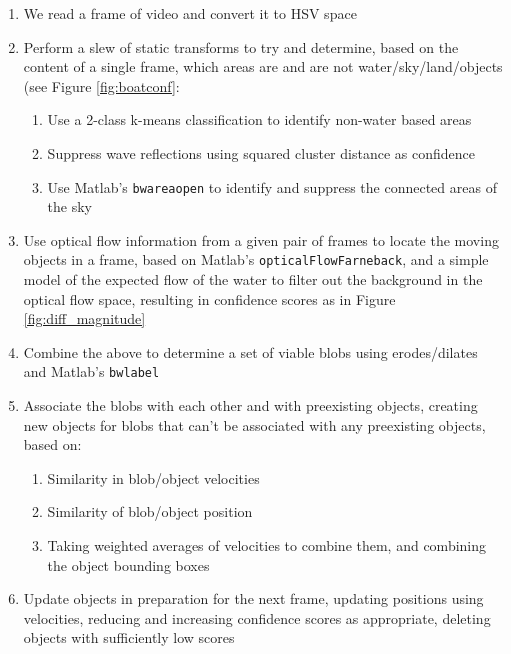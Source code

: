 \documentclass[conference]{IEEEtran}
\begin{document}
\begin{enumerate}
\item We read a frame of video and convert it to HSV space
\item Perform a slew of static transforms to try and determine,
      based on the content of a single frame, which areas are and
      are not water/sky/land/objects (see Figure \ref{fig:boatconf}:
  \begin{enumerate}
    \item Use a 2-class k-means classification to
          identify non-water based areas
    \item Suppress wave reflections using squared cluster distance as confidence
    \item Use Matlab's \texttt{bwareaopen} to
          identify and suppress the connected areas of the sky
  \end{enumerate}
\item Use optical flow information from a given pair of frames to
      locate the moving objects in a frame, based on Matlab's
      \texttt{opticalFlowFarneback}, and a simple model of the
      expected flow of the water to filter out the background in
      the optical flow space, resulting in confidence scores
      as in Figure \ref{fig:diff_magnitude}
\item Combine the above to determine a set of viable blobs using erodes/dilates
      and Matlab's \texttt{bwlabel}
\item Associate the blobs with each other and with preexisting objects,
      creating new objects for blobs that can't be associated with any
      preexisting objects, based on:
  \begin{enumerate}
    \item Similarity in blob/object velocities
    \item Similarity of blob/object position
    \item Taking weighted averages of velocities to combine them, and
          combining the object bounding boxes
  \end{enumerate}
\item Update objects in preparation for the next frame, updating
      positions using velocities, reducing and increasing confidence
      scores as appropriate, deleting objects with sufficiently low
      scores
\end{enumerate}
\end{document}
